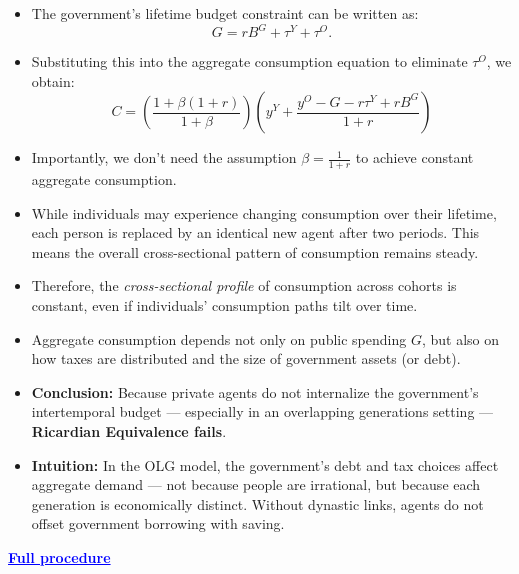 \documentclass[12pt]{article}
\begin{document}
\begin{itemize}
\item The government's lifetime budget constraint can be written as:
\[
G = r B^G + \tau^Y + \tau^O.
\]

\item Substituting this into the aggregate consumption equation to eliminate \( \tau^O \), we obtain:
\[
C = \left( \frac{1 + \beta (1 + r)}{1 + \beta} \right) \left( y^Y + \frac{y^O - G - r \tau^Y + r B^G}{1 + r} \right)
\]

\item Importantly, we don’t need the assumption \( \beta = \frac{1}{1 + r} \) to achieve constant aggregate consumption.

\item While individuals may experience changing consumption over their lifetime, each person is replaced by an identical new agent after two periods. This means the overall cross-sectional pattern of consumption remains steady.

\item Therefore, the \textit{cross-sectional profile} of consumption across cohorts is constant, even if individuals' consumption paths tilt over time.

\item Aggregate consumption depends not only on public spending \( G \), but also on how taxes are distributed and the size of government assets (or debt).

\item \textbf{Conclusion:} Because private agents do not internalize the government's intertemporal budget — especially in an overlapping generations setting — \textbf{Ricardian Equivalence fails}.

\item \textbf{Intuition:} In the OLG model, the government's debt and tax choices affect aggregate demand — not because people are irrational, but because each generation is economically distinct. Without dynastic links, agents do not offset government borrowing with saving.
\end{itemize}

\textcolor{blue}{\textbf{\uline{Full procedure}}}
\end{document}
